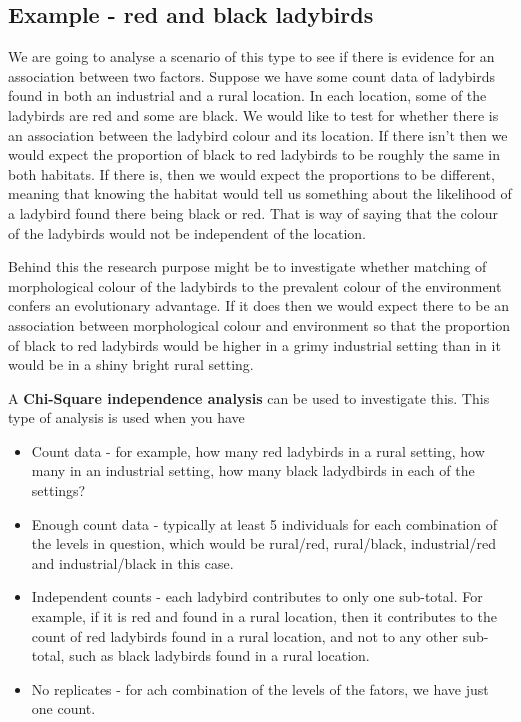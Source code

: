 \documentclass[
  letterpaper,
  DIV=11,
  numbers=noendperiod]{scrreprt}
\providecommand{\tightlist}{%
  \setlength{\itemsep}{0pt}\setlength{\parskip}{0pt}}\usepackage{longtable,booktabs,array}
\begin{document}
\subsection{Example - red and black
ladybirds}\label{example---red-and-black-ladybirds}

We are going to analyse a scenario of this type to see if there is
evidence for an association between two factors. Suppose we have some
count data of ladybirds found in both an industrial and a rural
location. In each location, some of the ladybirds are red and some are
black. We would like to test for whether there is an association between
the ladybird colour and its location. If there isn't then we would
expect the proportion of black to red ladybirds to be roughly the same
in both habitats. If there is, then we would expect the proportions to
be different, meaning that knowing the habitat would tell us something
about the likelihood of a ladybird found there being black or red. That
is way of saying that the colour of the ladybirds would not be
independent of the location.

Behind this the research purpose might be to investigate whether
matching of morphological colour of the ladybirds to the prevalent
colour of the environment confers an evolutionary advantage. If it does
then we would expect there to be an association between morphological
colour and environment so that the proportion of black to red ladybirds
would be higher in a grimy industrial setting than in it would be in a
shiny bright rural setting.

A \textbf{Chi-Square independence analysis} can be used to investigate
this. This type of analysis is used when you have

\begin{itemize}
\tightlist
\item
  Count data - for example, how many red ladybirds in a rural setting,
  how many in an industrial setting, how many black ladydbirds in each
  of the settings?
\item
  Enough count data - typically at least 5 individuals for each
  combination of the levels in question, which would be rural/red,
  rural/black, industrial/red and industrial/black in this case.
\item
  Independent counts - each ladybird contributes to only one sub-total.
  For example, if it is red and found in a rural location, then it
  contributes to the count of red ladybirds found in a rural location,
  and not to any other sub-total, such as black ladybirds found in a
  rural location.
\item
  No replicates - for ach combination of the levels of the fators, we
  have just one count.
\end{itemize}
\end{document}
